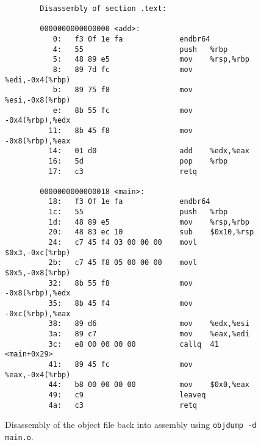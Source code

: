     \begin{figure}[H]
      \centering 
      \begin{lstlisting}
        Disassembly of section .text:

        0000000000000000 <add>:
           0:	f3 0f 1e fa          	endbr64 
           4:	55                   	push   %rbp
           5:	48 89 e5             	mov    %rsp,%rbp
           8:	89 7d fc             	mov    %edi,-0x4(%rbp)
           b:	89 75 f8             	mov    %esi,-0x8(%rbp)
           e:	8b 55 fc             	mov    -0x4(%rbp),%edx
          11:	8b 45 f8             	mov    -0x8(%rbp),%eax
          14:	01 d0                	add    %edx,%eax
          16:	5d                   	pop    %rbp
          17:	c3                   	retq   

        0000000000000018 <main>:
          18:	f3 0f 1e fa          	endbr64 
          1c:	55                   	push   %rbp
          1d:	48 89 e5             	mov    %rsp,%rbp
          20:	48 83 ec 10          	sub    $0x10,%rsp
          24:	c7 45 f4 03 00 00 00 	movl   $0x3,-0xc(%rbp)
          2b:	c7 45 f8 05 00 00 00 	movl   $0x5,-0x8(%rbp)
          32:	8b 55 f8             	mov    -0x8(%rbp),%edx
          35:	8b 45 f4             	mov    -0xc(%rbp),%eax
          38:	89 d6                	mov    %edx,%esi
          3a:	89 c7                	mov    %eax,%edi
          3c:	e8 00 00 00 00       	callq  41 <main+0x29>
          41:	89 45 fc             	mov    %eax,-0x4(%rbp)
          44:	b8 00 00 00 00       	mov    $0x0,%eax
          49:	c9                   	leaveq 
          4a:	c3                   	retq  
      \end{lstlisting}
      \caption{Disassembly of the object file back into assembly using \texttt{objdump -d main.o}. }
      \label{fig:disassembly_example-2}
    \end{figure}

